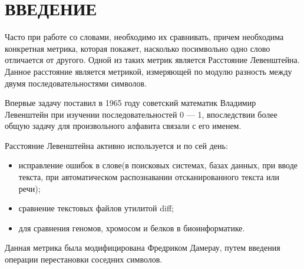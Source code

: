 \chapter*{\hfill{\centering  ВВЕДЕНИЕ}\hfill}


Часто при работе со словами, необходимо их сравнивать, причем необходима конкретная метрика, которая покажет, насколько посимвольно одно слово отличается от другого.
Одной из таких метрик является Расстояние Левенштейна.
Данное расстояние является метрикой, измеряющей по модулю разность между двумя последовательностями символов.

Впервые задачу поставил в 1965 году советский математик Владимир Левенштейн при изучении последовательностей 0 --- 1, впоследствии более общую задачу для произвольного алфавита связали с его именем.

Расстояние Левенштейна активно используется и по сей день:
\begin{itemize}[label=---]
	\item исправление ошибок в слове(в поисковых системах, базах данных, при вводе текста, при автоматическом распознавании отсканированного текста или речи);
	\item сравнение текстовых файлов утилитой diff;
	\item для сравнения геномов, хромосом и белков в биоинформатике.
\end{itemize}

Данная метрика была модифицирована Фредриком Дамерау, путем введения операции перестановки соседних символов.


